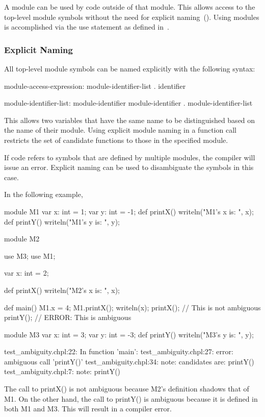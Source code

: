 A module can be used by code outside of that module.  This allows
access to the top-level module symbols without the need for explicit
naming~().  Using modules is accomplished via
the use statement as defined in~.

\subsubsection{Explicit Naming}
\label{Explicit_Naming}

All top-level module symbols can be named explicitly with the
following syntax:
\begin{syntax}
module-access-expression:
  module-identifier-list . identifier

module-identifier-list:
  module-identifier
  module-identifier . module-identifier-list

\end{syntax}
This allows two variables that have the same name to be distinguished
based on the name of their module.  Using explicit module naming in a
function call restricts the set of candidate functions to those in the
specified module.

If code refers to symbols that are defined by multiple modules, the
compiler will issue an error.  Explicit naming can be used to
disambiguate the symbols in this case.

\begin{example}
In the following example,
\begin{chapelpre}
\end{chapelpre}
\begin{chapel}
module M1 {
  var x: int = 1;
  var y: int = -1;
  def printX() {
    writeln("M1's x is: ", x);
  }
  def printY() {
    writeln("M1's y is: ", y);
  }
}
 
module M2 {
  use M3;
  use M1;

  var x: int = 2;

  def printX() {
    writeln("M2's x is: ", x);
  }

  def main() {
    M1.x = 4;
    M1.printX();
    writeln(x);
    printX(); // This is not ambiguous
    printY(); // ERROR: This is ambiguous
  }
}

module M3 {
  var x: int = 3;
  var y: int = -3;
  def printY() {
    writeln("M3's y is: ", y);
  }
}
\end{chapel}
\begin{chapeloutput}
test\_ambiguity.chpl:22: In function 'main':
test\_ambiguity.chpl:27: error: ambiguous call 'printY()'
test\_ambiguity.chpl:34: note: candidates are: printY()
test\_ambiguity.chpl:7: note:                 printY()
\end{chapeloutput}
The call to printX() is not ambiguous because M2's definition shadows
that of M1.  On the other hand, the call to printY() is ambiguous
because it is defined in both M1 and M3.  This will result in a
compiler error.


\end{example}


